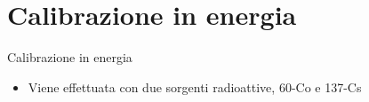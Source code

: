 \documentclass [xcolor=svgnames] {beamer}
\begin{document}
\section{Calibrazione in energia}
\begin{frame}{Calibrazione in energia}
	\begin{itemize}
		\item Viene effettuata con due sorgenti radioattive, 60-Co e 137-Cs
	\end{itemize}
	
	\vspace{5mm} %
	

\end{frame}
\end{document}
